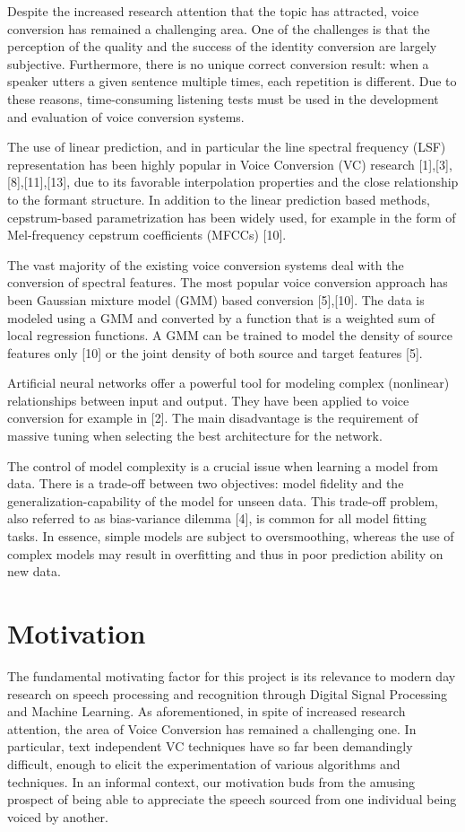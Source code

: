 \documentclass[BTech]{nitkdiss}
\begin{document}
Despite the increased research attention that the topic has attracted, voice conversion has remained a challenging area. One of the challenges is that the perception of the quality and the success of the identity conversion are largely subjective. Furthermore, there is no unique correct conversion result: when a speaker utters a given sentence multiple times, each repetition is different. Due to these reasons, time-consuming listening tests must be used in the development and evaluation of voice conversion systems.

The use of linear prediction, and in particular the line spectral frequency (LSF) representation has been highly popular in Voice Conversion (VC) research [1],[3],[8],[11],[13], due to its favorable interpolation properties and the close relationship to the formant structure. In addition to the linear prediction based methods, cepstrum-based parametrization has been widely used, for example in the form of Mel-frequency cepstrum coefficients (MFCCs) [10].

The vast majority of the existing voice conversion systems deal with the conversion of spectral features. The most popular voice conversion approach has been Gaussian mixture model (GMM) based conversion [5],[10]. The data is modeled using a GMM and converted by a function that is a weighted sum of local regression functions. A GMM can be trained to model the density of source features only [10] or the joint density of both source and target features [5].

Artificial neural networks offer a powerful tool for modeling complex (nonlinear) relationships between input and output. They have been applied to voice conversion for example in [2]. The main disadvantage is the requirement of massive tuning when selecting the best architecture for the network.

The control of model complexity is a crucial issue when learning a model from data. There is a trade-off between two objectives: model fidelity and the generalization-capability of the model for unseen data. This trade-off problem, also referred to as bias-variance dilemma [4], is common for all model fitting tasks. In essence, simple models are subject to oversmoothing, whereas the use of complex models may result in overfitting and thus in poor prediction ability on new data.

\section{Motivation}
The fundamental motivating factor for this project is its relevance to modern day research on speech processing and recognition through Digital Signal Processing and Machine Learning. As aforementioned, in spite of increased research attention, the area of Voice Conversion has remained a challenging one. In particular, text independent VC techniques have so far been demandingly difficult, enough to elicit the experimentation of various algorithms and techniques. In an informal context, our motivation buds from the amusing prospect of being able to appreciate the speech sourced from one individual being voiced by another. 
\end{document}
